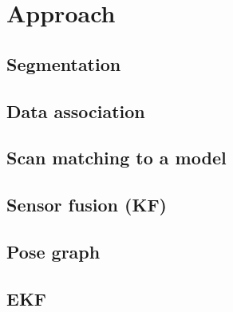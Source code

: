 \section{Approach}
\subsection{Segmentation}
\subsection{Data association}
\subsection{Scan matching to a model}
\subsection{Sensor fusion (KF)}

\subsection{Pose graph}

\subsection{EKF}
